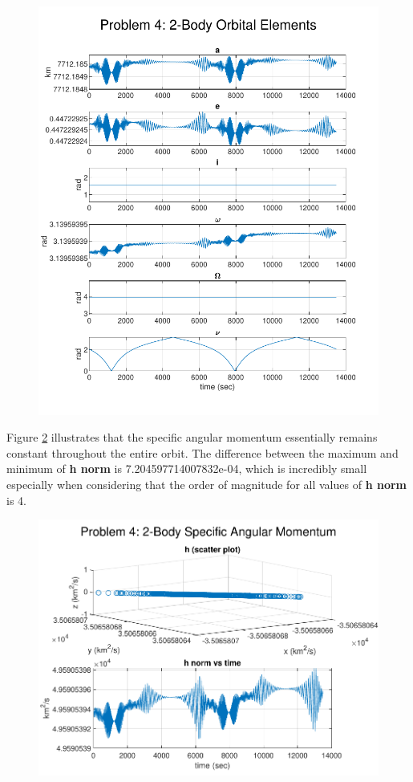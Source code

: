 \documentclass[conf]{new-aiaa}
\begin{document}
\begin{figure}[H]
	\centering
	\includegraphics{prob4_2bodoes.pdf}
	\caption{}
	\label{fig:prob4_2bodoes}
\end{figure}

Figure \ref{fig:prob4_angmom} illustrates that the specific angular momentum essentially remains constant throughout the entire orbit. The difference between the maximum and minimum of \textbf{h norm} is 7.204597714007832e-04, which is incredibly small especially when considering that the order of magnitude for all values of \textbf{h norm} is 4. 

\begin{figure}[H]
\centering
\includegraphics{prob4_angmom.pdf}
\caption{}
\label{fig:prob4_angmom}
\end{figure}
\end{document}
